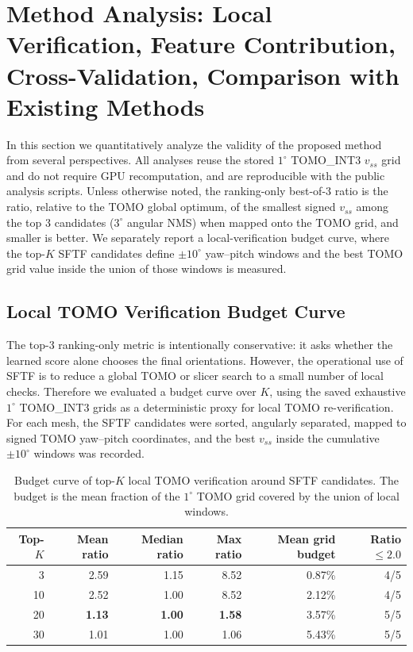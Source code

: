 \documentclass[11pt,a4paper]{article}
\begin{document}
\section{Method Analysis: Local Verification, Feature Contribution, Cross-Validation, Comparison with Existing Methods}

In this section we quantitatively analyze the validity of the proposed method from several perspectives.
All analyses reuse the stored $1^\circ$ TOMO\_INT3 $v_{ss}$ grid and do not require GPU recomputation,
and are reproducible with the public analysis scripts.
Unless otherwise noted, the ranking-only best-of-3 ratio is the ratio, relative to the TOMO global optimum, of the smallest signed $v_{ss}$
among the top 3 candidates ($3^\circ$ angular NMS) when mapped onto the TOMO grid, and smaller is better.
We separately report a local-verification budget curve, where the top-$K$ SFTF candidates define $\pm 10^\circ$ yaw--pitch windows
and the best TOMO grid value inside the union of those windows is measured.

\subsection{Local TOMO Verification Budget Curve}
\label{sec:budget-curve}

The top-3 ranking-only metric is intentionally conservative: it asks whether the learned score alone chooses the final orientations.
However, the operational use of SFTF is to reduce a global TOMO or slicer search to a small number of local checks.
Therefore we evaluated a budget curve over $K$, using the saved exhaustive $1^\circ$ TOMO\_INT3 grids as a deterministic proxy for local TOMO re-verification.
For each mesh, the SFTF candidates were sorted, angularly separated, mapped to signed TOMO yaw--pitch coordinates,
and the best $v_{ss}$ inside the cumulative $\pm 10^\circ$ windows was recorded.

\begin{table}[H]
\centering
\caption{Budget curve of top-$K$ local TOMO verification around SFTF candidates.
The budget is the mean fraction of the $1^\circ$ TOMO grid covered by the union of local windows.}
\label{tab:budget-curve}
\begin{tabular}{rrrrrr}
\toprule
Top-$K$ & Mean ratio & Median ratio & Max ratio & Mean grid budget & Ratio $\le 2.0$\\
\midrule
3  & 2.59 & 1.15 & 8.52 & 0.87\% & 4/5\\
10 & 2.52 & 1.00 & 8.52 & 2.12\% & 4/5\\
20 & \textbf{1.13} & \textbf{1.00} & \textbf{1.58} & 3.57\% & 5/5\\
30 & 1.01 & 1.00 & 1.06 & 5.43\% & 5/5\\
\bottomrule
\end{tabular}
\end{table}
\end{document}
